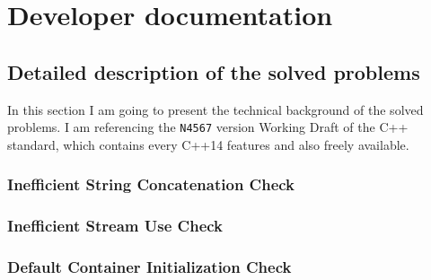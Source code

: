 \section{Developer documentation}
\subsection{Detailed description of the solved problems}
\par In this section I am going to present the technical background of the solved problems. I am referencing the \verb|N4567|\cite{cpp_standard} version Working Draft of the C++ standard, which contains every C++14 features and also freely available. 
\subsubsection{Inefficient String Concatenation Check}
\subsubsection{Inefficient Stream Use Check}
\subsubsection{Default Container Initialization Check}
